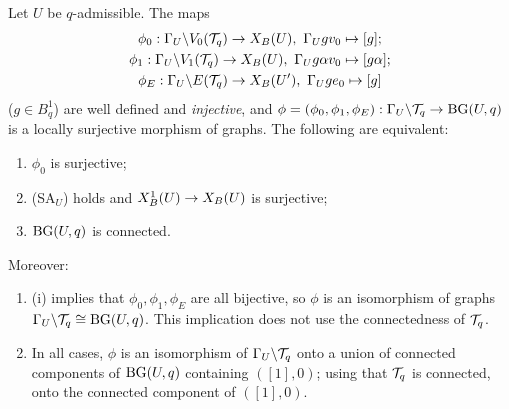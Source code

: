 \begin{proposition}\label{prop:s02-BG}
Let $U$ be $q$-admissible. The maps
\begin{gather*}
\phi_0:\Gamma_U\backslash V_0(\mathcal{T}_q)\to X_B(U),\ \Gamma_U gv_0\mapsto[g];\\
\phi_1:\Gamma_U\backslash V_1(\mathcal{T}_q)\to X_B(U),\ \Gamma_U g\alpha v_0\mapsto[g\alpha];\\
\phi_E:\Gamma_U\backslash E(\mathcal{T}_q)\to X_B(U'),\ \Gamma_U ge_0\mapsto[g]
\end{gather*}
($g\in B^1_q$) are well defined and \emph{injective}, and $\phi=(\phi_0,\phi_1,\phi_E):\Gamma_U\backslash\mathcal{T}_q\to\mathrm{BG}(U,q)$ is a locally
surjective morphism of graphs. The following are equivalent:
\begin{enumerate}[label=(\roman*)]
\item $\phi_0$ is surjective;
\item (SA$_U$) holds and $X^1_B(U)\to X_B(U)$ is surjective;
\item $\mathrm{BG}(U,q)$ is connected.
\end{enumerate}
Moreover:
\begin{enumerate}[label=(\alph*)]
\item (i) implies that $\phi_0,\phi_1,\phi_E$ are all bijective, so $\phi$ is an isomorphism of graphs $\Gamma_U\backslash\mathcal{T}_q\cong\mathrm{BG}(U,q)$.
  This implication does not use the connectedness of $\mathcal{T}_q$.
\item In all cases, $\phi$ is an isomorphism of $\Gamma_U\backslash\mathcal{T}_q$ onto a union of connected components of $\mathrm{BG}(U,q)$ containing
  $([1],0)$; using that $\mathcal{T}_q$ is connected, onto the connected component of $([1],0)$.
\end{enumerate}
\end{proposition}
